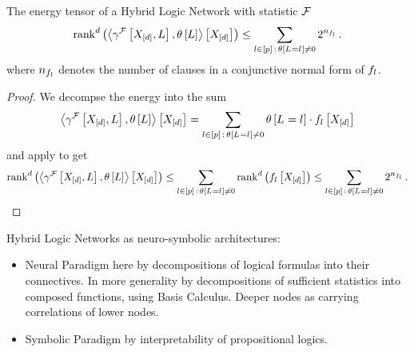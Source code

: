 \begin{corollary}
	The energy tensor of a Hybrid Logic Network with statistic $\mathcal{F}$
	\begin{align*}
		\mathrm{rank}^{d}\left(\left\langle \gamma^{\mathcal{F}}\left[X_{[d]},L\right],\theta\left[L\right]\right\rangle \left[ X_{[d]} \right]\right) \leq \sum_{l\in[p]\,:\,\theta\left[L_{}=l_{}\right]\neq0} 2^{n_{f_{l}}} \, .
	\end{align*}
	where $n_{f_{l}}$ denotes the number of clauses in a conjunctive normal form of $f_{l}$.
\end{corollary}
\begin{proof}
	We decompse the energy into the sum
	\begin{align*}
		\left\langle \gamma^{\mathcal{F}}\left[X_{[d]},L\right],\theta\left[L\right]\right\rangle \left[ X_{[d]} \right]
		= \sum_{l\in[p]\,:\,\theta\left[L_{}=l_{}\right]\neq0} \theta\left[L_{}=l_{}\right] \cdot f_{l}\left[X_{[d]}\right]
	\end{align*}
	and apply  to get
	\begin{align*}
		\mathrm{rank}^{d}\left(\left\langle \gamma^{\mathcal{F}}\left[X_{[d]},L\right],\theta\left[L\right]\right\rangle \left[ X_{[d]} \right]\right)
		\leq \sum_{l\in[p]\,:\,\theta\left[L_{}=l_{}\right]\neq0} \mathrm{rank}^{d}\left(f_{l}\left[X_{[d]}\right]\right)
		\leq \sum_{l\in[p]\,:\,\theta\left[L_{}=l_{}\right]\neq0}2^{n_{f_{l}}} \, .
	\end{align*}
\end{proof}


Hybrid Logic Networks as neuro-symbolic architectures:
\begin{itemize}
	\item Neural Paradigm here by decompositions of logical formulas into their connectives.
		In more generality by decompositions of sufficient statistics into composed functions, using Basis Calculus.
		Deeper nodes as carrying correlations of lower nodes.
	\item Symbolic Paradigm by interpretability of propositional logics.
\end{itemize}


